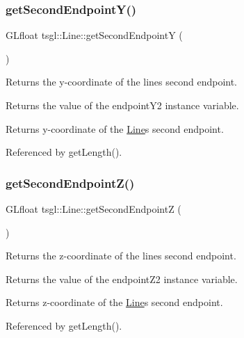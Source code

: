 \subsubsection{\texorpdfstring{get\+Second\+Endpoint\+Y()}{getSecondEndpointY()}}
{\footnotesize\ttfamily G\+Lfloat tsgl\+::\+Line\+::get\+Second\+EndpointY (\begin{DoxyParamCaption}{ }\end{DoxyParamCaption})}



Returns the y-\/coordinate of the line\textquotesingle{}s second endpoint. 

Returns the value of the endpoint\+Y2 instance variable. \begin{DoxyReturn}{Returns}
y-\/coordinate of the \hyperlink{classtsgl_1_1_line}{Line}\textquotesingle{}s second endpoint. 
\end{DoxyReturn}


Referenced by get\+Length().

\mbox{\label{classtsgl_1_1_line_a498daae6c481ed0c4d8e86fc9da11053}} 
\subsubsection{\texorpdfstring{get\+Second\+Endpoint\+Z()}{getSecondEndpointZ()}}
{\footnotesize\ttfamily G\+Lfloat tsgl\+::\+Line\+::get\+Second\+EndpointZ (\begin{DoxyParamCaption}{ }\end{DoxyParamCaption})}



Returns the z-\/coordinate of the line\textquotesingle{}s second endpoint. 

Returns the value of the endpoint\+Z2 instance variable. \begin{DoxyReturn}{Returns}
z-\/coordinate of the \hyperlink{classtsgl_1_1_line}{Line}\textquotesingle{}s second endpoint. 
\end{DoxyReturn}


Referenced by get\+Length().

\mbox{\label{classtsgl_1_1_line_ac000cf214382a69cd37010d5d04fe6ba}} 
